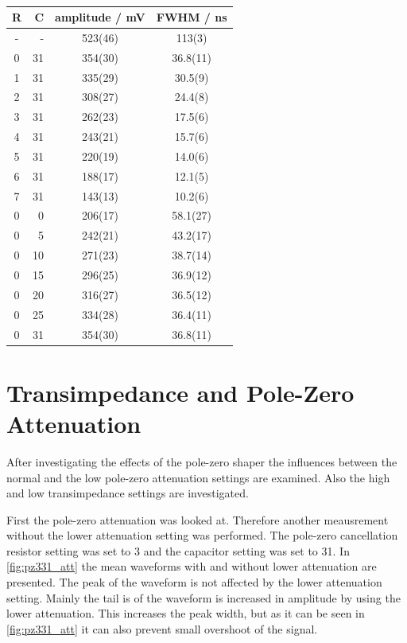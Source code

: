 \begin{table}
	\centering
	\caption[]{}
	\label{tab:pz_res_cap}
	\renewcommand{\arraystretch}{1.3}
	\begin{tabular}{c|r|S[table-format=3.0(2)]|S[table-format=3.1(3)]}
		\toprule
		R & C & {amplitude / \si{\milli\volt}} & {FWHM / \si{\nano\second}} \\
		\midrule
		- &  - & 523(46) & 113(3) \\
		0 & 31 & 354(30) & 36.8(11) \\
		1 & 31 & 335(29) & 30.5(9) \\
		2 & 31 & 308(27) & 24.4(8) \\
		3 & 31 & 262(23) & 17.5(6) \\
		4 & 31 & 243(21) & 15.7(6) \\
		5 & 31 & 220(19) & 14.0(6) \\
		6 & 31 & 188(17) & 12.1(5) \\
		7 & 31 & 143(13) & 10.2(6) \\
		0 &  0 & 206(17) & 58.1(27) \\
		0 &  5 & 242(21) & 43.2(17) \\
		0 & 10 & 271(23) & 38.7(14) \\
		0 & 15 & 296(25) & 36.9(12) \\
		0 & 20 & 316(27) & 36.5(12) \\
		0 & 25 & 334(28) & 36.4(11) \\
		0 & 31 & 354(30) & 36.8(11) \\ 
		\bottomrule
	\end{tabular}
	\renewcommand{\arraystretch}{1}
\end{table}



\section{Transimpedance and Pole-Zero Attenuation}
After investigating the effects of the pole-zero shaper the influences between the normal and the low pole-zero attenuation settings are examined.
Also the high and low transimpedance settings are investigated.

First the pole-zero attenuation was looked at.
Therefore another meausrement without the lower attenuation setting was performed.
The pole-zero cancellation resistor setting was set to 3 and the capacitor setting was set to 31. 
In \autoref{fig:pz331_att} the mean waveforms with and without lower attenuation are presented.
The peak of the waveform is not affected by the lower attenuation setting.
Mainly the tail is of the waveform is increased in amplitude by using the lower attenuation.
This increases the peak width, but as it can be seen in \autoref{fig:pz331_att} it can also prevent small overshoot of the signal.

